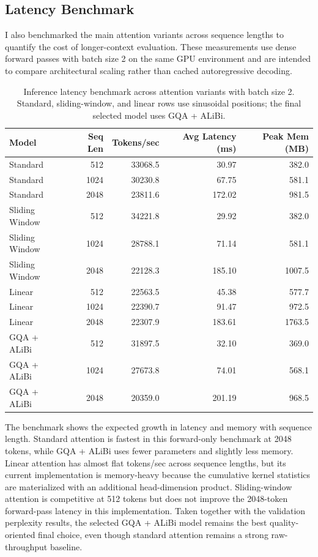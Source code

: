 \documentclass{article}
\begin{document}
\subsection{Latency Benchmark}

I also benchmarked the main attention variants across sequence lengths to
quantify the cost of longer-context evaluation. These measurements use dense
forward passes with batch size 2 on the same GPU environment and are intended
to compare architectural scaling rather than cached autoregressive decoding.

\begin{table}[h]
\centering
\small
\begin{tabular}{lrrrr}
\toprule
Model & Seq Len & Tokens/sec & Avg Latency (ms) & Peak Mem (MB) \\
\midrule
Standard & 512 & 33068.5 & 30.97 & 382.0 \\
Standard & 1024 & 30230.8 & 67.75 & 581.1 \\
Standard & 2048 & 23811.6 & 172.02 & 981.5 \\
Sliding Window & 512 & 34221.8 & 29.92 & 382.0 \\
Sliding Window & 1024 & 28788.1 & 71.14 & 581.1 \\
Sliding Window & 2048 & 22128.3 & 185.10 & 1007.5 \\
Linear & 512 & 22563.5 & 45.38 & 577.7 \\
Linear & 1024 & 22390.7 & 91.47 & 972.5 \\
Linear & 2048 & 22307.9 & 183.61 & 1763.5 \\
GQA + ALiBi & 512 & 31897.5 & 32.10 & 369.0 \\
GQA + ALiBi & 1024 & 27673.8 & 74.01 & 568.1 \\
GQA + ALiBi & 2048 & 20359.0 & 201.19 & 968.5 \\
\bottomrule
\end{tabular}
\caption{Inference latency benchmark across attention variants with batch size 2. Standard, sliding-window, and linear rows use sinusoidal positions; the final selected model uses GQA + ALiBi.}
\end{table}

The benchmark shows the expected growth in latency and memory with sequence
length. Standard attention is fastest in this forward-only benchmark at 2048
tokens, while GQA + ALiBi uses fewer parameters and slightly less memory. Linear
attention has almost flat tokens/sec across sequence lengths, but its current
implementation is memory-heavy because the cumulative kernel statistics are
materialized with an additional head-dimension product. Sliding-window attention
is competitive at 512 tokens but does not improve the 2048-token forward-pass
latency in this implementation. Taken together with the validation perplexity
results, the selected GQA + ALiBi model remains the best quality-oriented final
choice, even though standard attention remains a strong raw-throughput baseline.
\end{document}
